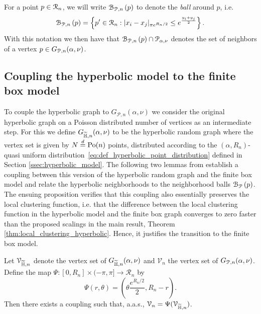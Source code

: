 For a point $p \in {\mathcal R}_n$, we will write ${\mathcal B}_{{\mathcal P},n}\left(p\right)$ to denote the \emph{ball} around $p$, i.e.
\begin{equation}\label{eq:def_ball_P_n}
	{\mathcal B}_{{\mathcal P},n}\left(p\right) = \left\{p^\prime \in {\mathcal R}_n : |x_i - x_j|_{\pi e^{R_n/2}} \leq e^{\frac{y_i + y_j}{2}}\right\}.
\end{equation}
With this notation we then have that ${\mathcal B}_{{\mathcal P},n}\left(p\right) \cap {\mathcal P}_{\alpha, \nu}$ denotes the set of neighbors of a vertex $p \in G_{{\mathcal P},n}(\alpha,\nu)$.  


\subsection{Coupling the hyperbolic model to the finite box model}\label{ssec:coupling_H_P}

To couple the hyperbolic graph to $G_{\mathcal{P},n}(\alpha, \nu)$ we consider the original hyperbolic graph on a Poisson distributed number of vertices as an intermediate step. For this we define $G_{\widetilde{\mathbb{H}},n}(\alpha, \nu)$ to be the hyperbolic random graph where the vertex set is given by $N \stackrel{d}{=} {\mathrm{Po}}(n)$ points, distributed according to the $(\alpha, R_n)$-quasi uniform distribution~\eqref{eq:def_hyperbolic_point_distribution} defined in Section \ref{ssec:hyperbolic_model}. The following two lemmas from \cite{fountoulakis2018law} establish a coupling between this version of the hyperbolic random graph and the finite box model and relate the hyperbolic neighborhoods to the neighborhood balls ${\mathcal B}_{{\mathcal P}}\left(p\right)$. The ensuing proposition verifies that this coupling also essentially preserves the local clustering function, i.e. that the difference between the local clustering function in the hyperbolic model and the finite box graph converges to zero faster than the proposed scalings in the main result, Theorem \ref{thm:local_clustering_hyperbolic}. Hence, it justifies the transition to the finite box model. 

\begin{lemma}\label{lem:coupling_hyperbolic_poisson}
Let $\mathcal{V}_{\widetilde{\mathbb{H}}, n}$ denote the vertex set of $G_{\widetilde{\mathbb{H}},n}(\alpha, \nu)$ and $\mathcal{V}_n$ the vertex set of $G_{{\mathcal P},n}(\alpha, \nu)$. Define the map $\Psi : [0,R_n] \times (-\pi, \pi] \to \mathcal{R}_n$ by
\begin{equation}\label{eq:def_Psi}
	\Psi(r,\theta) = \left(\theta \frac{e^{R_n/2}}{2}, R_n - r\right).
\end{equation}
Then there exists a coupling such that, a.a.s., $\mathcal{V}_n = \Psi(\mathcal{V}_{\widetilde{\mathbb{H}},n})$. %
\end{lemma}

